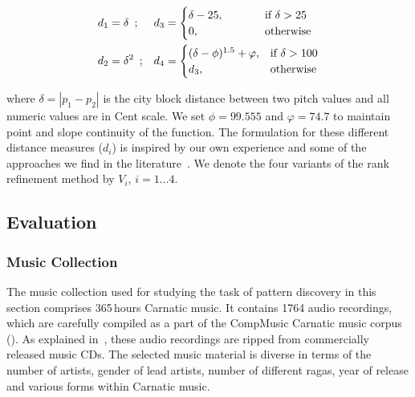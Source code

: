 \begin{equation}
\begin{aligned}
d_1& = \delta \hspace{.5em};&
d_3& = 
\begin{cases}
\delta-25, & \hspace{1cm} \text{if } \delta >25\\
0, & \hspace{1cm}\text{otherwise } 
\end{cases}
\\
d_2& = \delta^2 \hspace{.5em};&
d_4 &= 
\begin{cases}
(\delta-\phi)^{1.5} + \varphi, & \text{if } \delta >100\\
d_3, & \text{otherwise}
\end{cases}
\end{aligned}
\label{eq:distance_measures_discovery}
\end{equation}

\noindent where $\delta = |p_1-p_2|$ is the city block distance between two pitch values and all numeric values are in Cent scale. We set $\phi =99.555$ and $\varphi = 74.7$ to maintain point and slope continuity of the function. The formulation for these different distance measures ($d_i$) is inspired by our own experience and some of the approaches we find in the literature~\citep{Ishwar2013,Rao2014}. We denote the four variants of the rank refinement method by $V_i$, $i=1\dots 4$.


\subsection{Evaluation}

\subsubsection{Music Collection}
\label{sec:pattern_discovery_musiccollection}

The music collection used for studying the task of pattern discovery in this section comprises 365\,hours Carnatic music. It contains 1764 audio recordings, which are carefully compiled as a part of the CompMusic Carnatic music corpus (). As explained in~, these audio recordings are ripped from commercially released music CDs. The selected music material is diverse in terms of the number of artists, gender of lead artists, number of different \glspl{raga}, year of release and various forms within Carnatic music.

